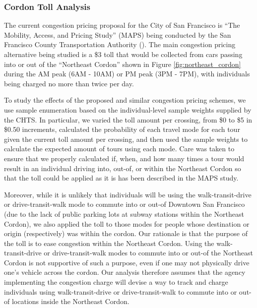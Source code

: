 \subsubsection{Cordon Toll Analysis}
\label{sec:application_cordon_analysis_procedures}
The current congestion pricing proposal for the City of San Francisco is ``The Mobility, Access, and Pricing Study'' (MAPS) being conducted by the San Francisco County Transportation Authority (\citeyear{sfcta_san_2010}). The main congestion pricing alternative being studied is a \$3 toll that would be collected from cars passing into or out of the ``Northeast Cordon'' shown in Figure \ref{fig:northeast_cordon} during the AM peak (6AM - 10AM) or PM peak (3PM - 7PM), with individuals being charged no more than twice per day.

To study the effects of the proposed and similar congestion pricing schemes, we use sample enumeration based on the individual-level sample weights supplied by the CHTS. In particular, we varied the toll amount per crossing, from \$0 to \$5 in \$0.50 increments, calculated the probability of each travel mode for each tour given the current toll amount per crossing, and then used the sample weights to calculate the expected amount of tours using each mode. Care was taken to ensure that we properly calculated if, when, and how many times a tour would result in an individual driving into, out-of, or within the Northeast Cordon so that the toll could be applied as it is has been described in the MAPS study. 

Moreover, while it is unlikely that individuals will be using the walk-transit-drive or drive-transit-walk mode to commute into or out-of Downtown San Francisco (due to the lack of public parking lots at subway stations within the Northeast Cordon), we also applied the toll to those modes for people whose destination or origin (respectively) was within the cordon. Our rationale is that the purpose of the toll is to ease congestion within the Northeast Cordon. Using the walk-transit-drive or drive-transit-walk modes to commute into or out-of the Northeast Cordon is not supportive of such a purpose, even if one may not physically drive one's vehicle across the cordon. Our analysis therefore assumes that the agency implementing the congestion charge will devise a way to track and charge individuals using walk-transit-drive or drive-transit-walk to commute into or out-of locations inside the Northeast Cordon.

